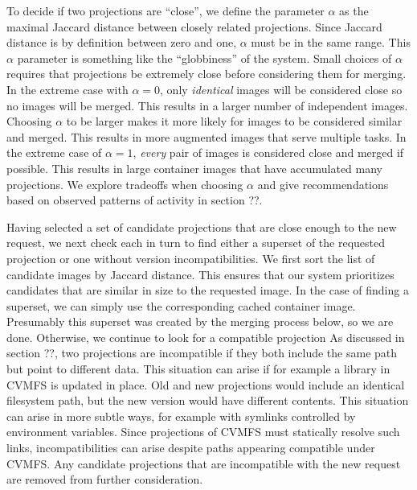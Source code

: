 \documentclass[sigconf]{acmart}
\begin{document}
To decide if two projections are ``close'',
we define the parameter $\alpha$ as the maximal Jaccard distance between closely related projections.
Since Jaccard distance is by definition between zero and one,
$\alpha$ must be in the same range.
This $\alpha$ parameter is something like the ``globbiness'' of the system.
Small choices of $\alpha$ requires that projections be extremely close before considering them for merging.
In the extreme case with $\alpha = 0$,
only \emph{identical} images will be considered close so no images will be merged.
This results in a larger number of independent images.
Choosing $\alpha$ to be larger makes it more likely for images to be considered similar and merged.
This results in more augmented images that serve multiple tasks.
In the extreme case of $\alpha = 1$,
\emph{every} pair of images is considered close and merged if possible.
This results in large container images that have accumulated many projections.
We explore tradeoffs when choosing $\alpha$ and give recommendations based on observed patterns of activity in section ??.

Having selected a set of candidate projections that are close enough to the new request,
we next check each in turn to find either a superset of the requested projection or one without version incompatibilities.
We first sort the list of candidate images by Jaccard distance.
This ensures that our system prioritizes candidates that are similar in size to the requested image.
In the case of finding a superset,
we can simply use the corresponding cached container image.
Presumably this superset was created by the merging process below,
so we are done.
Otherwise, we continue to look for a compatible projection
As discussed in section ??,
two projections are incompatible if they both include the same path but point to different data.
This situation can arise if for example a library in CVMFS is updated in place.
Old and new projections would include an identical filesystem path,
but the new version would have different contents.
This situation can arise in more subtle ways,
for example with symlinks controlled by environment variables.
Since projections of CVMFS must statically resolve such links,
incompatibilities can arise despite paths appearing compatible under CVMFS.
Any candidate projections that are incompatible with the new request are removed from further consideration.
\end{document}
